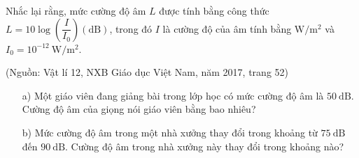 \begin{bt}
	Nhắc lại rằng, mức cường độ âm $L$ được tính bằng công thức $L=10 \log \left(\dfrac{I}{I_0}\right)(\mathrm{dB})$, trong đó $I$ là cường độ của âm tính bằng $\mathrm{W}/ \mathrm{m}^2$ và $I_0=10^{-12} \mathrm{~W} / \mathrm{m}^2$.
	\begin{flushright}
		(Nguồn: Vật lí 12, NXB Giáo dục Việt Nam, năm 2017, trang 52)
	\end{flushright}
	\begin{itemize}
		\item[a)] Một giáo viên đang giảng bài trong lớp học có mức cường độ âm là $50 \mathrm{~dB}$. Cường độ âm của giọng nói giáo viên bằng bao nhiêu?
		\item[b)] Mức cường độ âm trong một nhà xưởng thay đổi trong khoảng từ $75 \mathrm{~dB}$ đến $90 \mathrm{~dB}$. Cường độ âm trong nhà xưởng này thay đổi trong khoảng nào?
	\end{itemize}
\end{bt}
